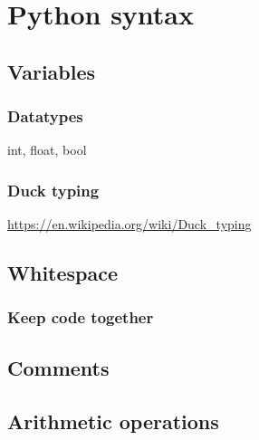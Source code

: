  

\chapter{Python syntax}

	\section{Variables}
	
		\subsection{Datatypes}
		
		int, float, bool
		
		\subsection{Duck typing}
		
		\url{https://en.wikipedia.org/wiki/Duck_typing}
		
	\section{Whitespace}
	
		\subsection{Keep code together}
		
	\section{Comments}
	
	
	\section{Arithmetic operations}
	
	
	
